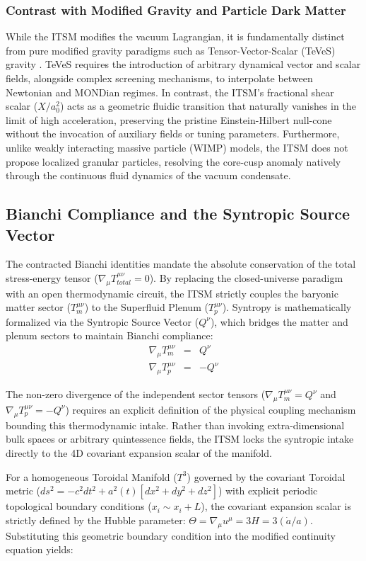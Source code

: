 \documentclass[aps,prd,10pt,twocolumn,superscriptaddress,nofootinbib,floatfix]{revtex4-2}
\begin{document}
\subsubsection{Contrast with Modified Gravity and Particle Dark Matter}
While the ITSM modifies the vacuum Lagrangian, it is fundamentally distinct from pure modified gravity paradigms such as Tensor-Vector-Scalar (TeVeS) gravity \cite{teves}. TeVeS requires the introduction of arbitrary dynamical vector and scalar fields, alongside complex screening mechanisms, to interpolate between Newtonian and MONDian regimes. In contrast, the ITSM's fractional shear scalar ($X/a_0^2$) acts as a geometric fluidic transition that naturally vanishes in the limit of high acceleration, preserving the pristine Einstein-Hilbert null-cone without the invocation of auxiliary fields or tuning parameters. Furthermore, unlike weakly interacting massive particle (WIMP) models, the ITSM does not propose localized granular particles, resolving the core-cusp anomaly natively through the continuous fluid dynamics of the vacuum condensate.

\subsection{Bianchi Compliance and the Syntropic Source Vector}
The contracted Bianchi identities mandate the absolute conservation of the total stress-energy tensor ($\nabla_\mu T_{total}^{\mu\nu} = 0$). By replacing the closed-universe paradigm with an open thermodynamic circuit, the ITSM strictly couples the baryonic matter sector ($T_m^{\mu\nu}$) to the Superfluid Plenum ($T_p^{\mu\nu}$). Syntropy is mathematically formalized via the Syntropic Source Vector ($Q^\nu$), which bridges the matter and plenum sectors to maintain Bianchi compliance:
\begin{eqnarray}
\nabla_\mu T_m^{\mu\nu} &=& Q^\nu \\
\nabla_\mu T_p^{\mu\nu} &=& -Q^\nu
\end{eqnarray}

The non-zero divergence of the independent sector tensors ($\nabla_{\mu}T_{m}^{\mu\nu} = Q^{\nu}$ and $\nabla_{\mu}T_{p}^{\mu\nu} = -Q^{\nu}$) requires an explicit definition of the physical coupling mechanism bounding this thermodynamic intake. Rather than invoking extra-dimensional bulk spaces or arbitrary quintessence fields, the ITSM locks the syntropic intake directly to the 4D covariant expansion scalar of the manifold. 

For a homogeneous Toroidal Manifold ($T^3$) governed by the covariant Toroidal metric ($ds^2 = -c^2dt^2 + a^2(t)[dx^2 + dy^2 + dz^2]$) with explicit periodic topological boundary conditions ($x_i \sim x_i + L$), the covariant expansion scalar is strictly defined by the Hubble parameter: $\Theta = \nabla_\mu u^\mu = 3H = 3(\dot{a}/a)$. Substituting this geometric boundary condition into the modified continuity equation yields:
\end{document}

